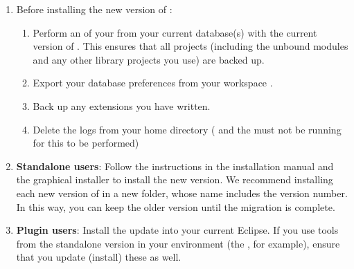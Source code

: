 \begin{enumerate}
\item Before installing the new version of \app{}:
\begin{enumerate}
\item Perform an  of your \gdprojects{} from your current database(s) with the current version of \app{} . This ensures that all projects (including the unbound modules and any other library projects you use) are backed up.
\item Export your database preferences from your workspace .
\item Back up any extensions you have written.
\item Delete the logs from your home directory (\app{} and the \gdagent{} must not be running for this to be performed)
\end{enumerate}
\item \textbf{Standalone users}: Follow the instructions in the installation manual and the graphical installer to install the new version. We recommend installing each new version of \app{} in a new folder, whose name includes the version number. In this way, you can keep the older version until the migration is complete. 
\item \textbf{Plugin users}: Install the update into your current Eclipse. If you use tools from the standalone version in your environment (the \gdagent{}, for example), ensure that you update (install) these as well. 
\end{enumerate}
